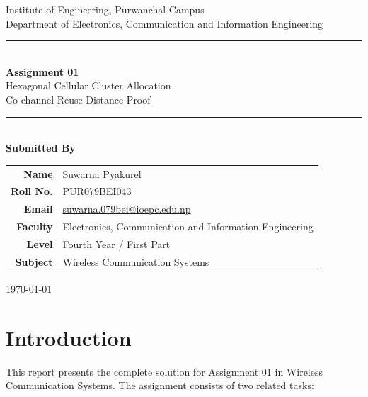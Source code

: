 \documentclass[12pt,a4paper]{report}
\begin{document}
\begin{titlepage}
    \centering
    \vspace*{1.2cm}

    {\Large Institute of Engineering, Purwanchal Campus}\\[0.4cm]
    {\large Department of Electronics, Communication and Information Engineering}\\[1.8cm]

    \rule{\linewidth}{0.8pt}\\[0.6cm]
    {\Huge\bfseries Assignment 01}\\[0.4cm]
    {\LARGE Hexagonal Cellular Cluster Allocation}\\[0.2cm]
    {\large Co-channel Reuse Distance Proof}\\[0.6cm]
    \rule{\linewidth}{0.8pt}\\[2cm]

    {\Large\bfseries Submitted By}\\[0.8cm]
    \begin{tabular}{rl}
        \textbf{Name}      & Suwarna Pyakurel \\[0.25cm]
        \textbf{Roll No.}  & PUR079BEI043 \\[0.25cm]
        \textbf{Email}     & \href{mailto:suwarna.079bei@ioepc.edu.np}{suwarna.079bei@ioepc.edu.np} \\[0.25cm]
        \textbf{Faculty}   & Electronics, Communication and Information Engineering \\[0.25cm]
        \textbf{Level}     & Fourth Year / First Part \\[0.25cm]
        \textbf{Subject}   & Wireless Communication Systems \\
    \end{tabular}

    \vfill
    {\large \today}
\end{titlepage}

\tableofcontents
\clearpage
{}

\chapter{Introduction}

This report presents the complete solution for Assignment 01 in Wireless Communication Systems. The assignment consists of two related tasks:
\end{document}
